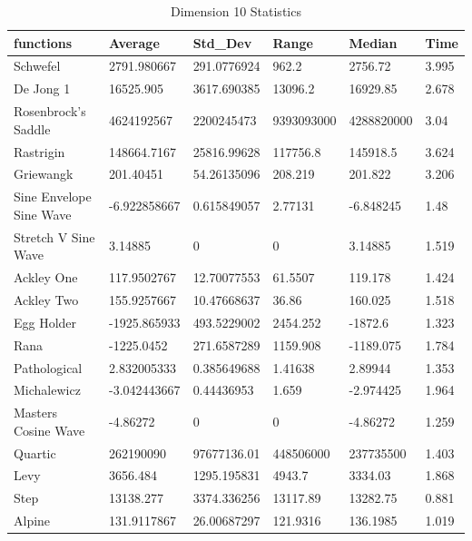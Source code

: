 \documentclass[12pt]{article}
\begin{document}
		\begin{table}[h]
			\centering
			\caption{Dimension 10 Statistics}
			\begin{tabular}{llllll} 
				\hline
				\textbf{functions}      & \textbf{Average} & \textbf{Std\_Dev} & \textbf{Range} & \textbf{Median} & \textbf{Time}  \\ 
				\hline
				Schwefel                & 2791.980667      & 291.0776924       & 962.2          & 2756.72         & 3.995          \\
				De Jong 1               & 16525.905        & 3617.690385       & 13096.2        & 16929.85        & 2.678          \\
				Rosenbrock's Saddle     & 4624192567       & 2200245473        & 9393093000     & 4288820000      & 3.04           \\
				Rastrigin               & 148664.7167      & 25816.99628       & 117756.8       & 145918.5        & 3.624          \\
				Griewangk               & 201.40451        & 54.26135096       & 208.219        & 201.822         & 3.206          \\
				Sine Envelope Sine Wave & -6.922858667     & 0.615849057       & 2.77131        & -6.848245       & 1.48           \\
				Stretch V Sine Wave     & 3.14885          & 0                 & 0              & 3.14885         & 1.519          \\
				Ackley One              & 117.9502767      & 12.70077553       & 61.5507        & 119.178         & 1.424          \\
				Ackley Two              & 155.9257667      & 10.47668637       & 36.86          & 160.025         & 1.518          \\
				Egg Holder              & -1925.865933     & 493.5229002       & 2454.252       & -1872.6         & 1.323          \\
				Rana                    & -1225.0452       & 271.6587289       & 1159.908       & -1189.075       & 1.784          \\
				Pathological            & 2.832005333      & 0.385649688       & 1.41638        & 2.89944         & 1.353          \\
				Michalewicz             & -3.042443667     & 0.44436953        & 1.659          & -2.974425       & 1.964          \\
				Masters Cosine Wave  & -4.86272         & 0                 & 0              & -4.86272        & 1.259          \\
				Quartic                 & 262190090        & 97677136.01       & 448506000      & 237735500       & 1.403          \\
				Levy                    & 3656.484         & 1295.195831       & 4943.7         & 3334.03         & 1.868          \\
				Step                    & 13138.277        & 3374.336256       & 13117.89       & 13282.75        & 0.881          \\
				Alpine                  & 131.9117867      & 26.00687297       & 121.9316       & 136.1985        & 1.019          \\
				\hline
			\end{tabular}
		\end{table}
\end{document}
